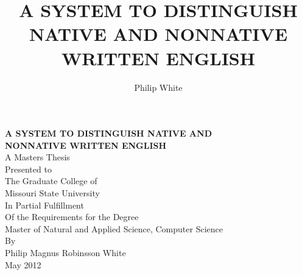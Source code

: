 \documentclass[12pt]{article}
\title{\textbf{A SYSTEM TO DISTINGUISH NATIVE AND NONNATIVE WRITTEN ENGLISH}}
\author{Philip White}
\numberwithin{figure}{section}
\numberwithin{table}{section}
\numberwithin{enums}{section}
\def\biblio{}
\let\stdsection\section
\renewcommand\section{\clearpage\stdsection}
\begin{document}
\def\biblio{} %


{}
\begin{titlepage}

\centering

\textbf{A SYSTEM TO DISTINGUISH NATIVE AND\\NONNATIVE WRITTEN ENGLISH}\\

\null\null
A Masters Thesis\\
Presented to\\
The Graduate College of\\
Missouri State University\\
\null\null\null\null
In Partial Fulfillment\\
Of the Requirements for the Degree\\
Master of Natural and Applied Science, Computer Science\\
\null\null\null\null
By\\
Philip Magnus Robinsson White\\
May 2012

\end{titlepage}
\setcounter{page}{2}

\newpage


\singlespacing
\tableofcontents
\doublespacing
\newpage
{}
\setcounter{page}{1}
\setcounter{secnumdepth}{-1}

\titleformat{\section}{\normalfont\bfseries\centering}{}{}{\MakeUppercase}
\titleformat{\subsection}{\normalfont\bfseries}{}{}{}
\titlespacing*{\subsection}{0pt}{24pt}{0pt}




\end{document}
